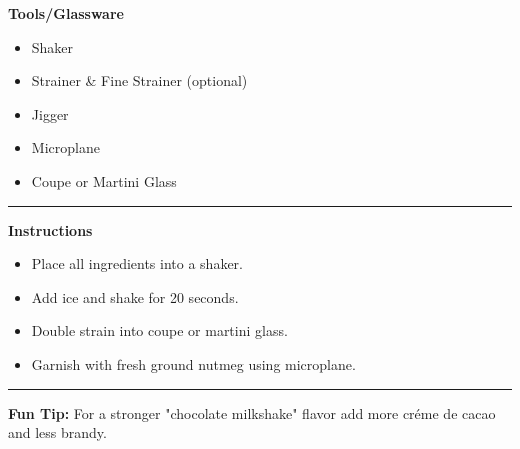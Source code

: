 \hspace{.01\textwidth}\vrule\hspace{.01\textwidth}
\begin{minipage}[t]{.48\textwidth}
    \noindent
    \textbf{\large Tools/Glassware}
    \begin{itemize}
        \item Shaker
        \item Strainer \& Fine Strainer (optional)
        \item Jigger
        \item Microplane
        \item Coupe or Martini Glass
    \end{itemize}
\end{minipage}
\vspace{.5em}\hrule\vspace{.5em}
\noindent
\begin{minipage}{\textwidth}
    \noindent
    \textbf{\large Instructions}
    \begin{itemize}
        \item Place all ingredients into a shaker.
        \item Add ice and shake for 20 seconds.
        \item Double strain into coupe or martini glass.
        \item Garnish with fresh ground nutmeg using microplane.
    \end{itemize}
\end{minipage}
\vspace{.5em}\hrule\vspace{.5em}
\noindent
\textbf{\large Fun Tip:} For a stronger "chocolate milkshake" flavor add more créme de cacao and less brandy.
\newpage
